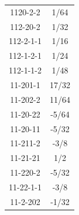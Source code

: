 \begin{tabular}[t]{|cc|}
1120-2-2 &  1/64\\
112-20-2 &  1/32\\
112-2-1-1 &  1/16\\
112-1-2-1 &  1/24\\
112-1-1-2 &  1/48\\
11-201-1 &  17/32\\
11-202-2 &  11/64\\
11-20-22 &  -5/64\\
11-20-11 &  -5/32\\
11-211-2 &  -3/8\\
11-21-21 &  1/2\\
11-220-2 &  -5/32\\
11-22-1-1 &  -3/8\\
11-2-202 &  -1/32\\
\hline
\end{tabular}
